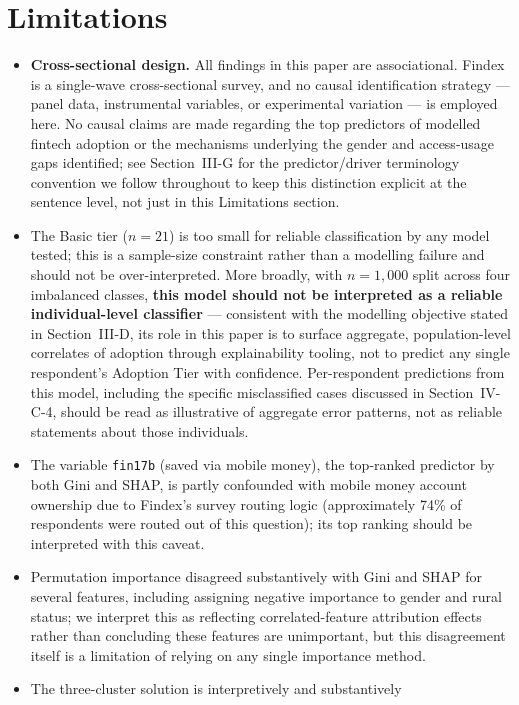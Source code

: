 \documentclass[conference]{IEEEtran}
\begin{document}
\section{Limitations}
\label{sec:limitations}
\begin{itemize}
\item \textbf{Cross-sectional design.} All findings in this paper are
associational. Findex is a single-wave cross-sectional survey, and no
causal identification strategy --- panel data, instrumental variables,
or experimental variation --- is employed here. No causal claims are
made regarding the top predictors of modelled fintech adoption or the mechanisms 
underlying the gender and access-usage gaps identified; see Section~III-G for the
predictor/driver terminology convention we follow throughout to keep
this distinction explicit at the sentence level, not just in this
Limitations section.
\item The Basic tier ($n=21$) is too small for reliable classification by
any model tested; this is a sample-size constraint rather than a
modelling failure and should not be over-interpreted. More broadly, with
$n=1{,}000$ split across four imbalanced classes, \textbf{this model
should not be interpreted as a reliable individual-level classifier} ---
consistent with the modelling objective stated in Section~III-D, its
role in this paper is to surface aggregate, population-level correlates
of adoption through explainability tooling, not to predict any single
respondent's Adoption Tier with confidence. Per-respondent predictions
from this model, including the specific misclassified cases discussed in
Section~IV-C-4, should be read as illustrative of aggregate error
patterns, not as reliable statements about those individuals.
\item The variable \texttt{fin17b} (saved via mobile money), the top-ranked predictor by both Gini and SHAP, is partly confounded with mobile money account ownership due to Findex's survey routing logic (approximately 74\% of respondents were routed out of this question); its top ranking should be interpreted with this caveat.
\item Permutation importance disagreed substantively with Gini and SHAP for several features, including assigning negative importance to gender and rural status; we interpret this as reflecting correlated-feature attribution effects rather than concluding these features are unimportant, but this disagreement itself is a limitation of relying on any single importance method.
\item The three-cluster solution is interpretively and substantively

\end{itemize}
\end{document}
